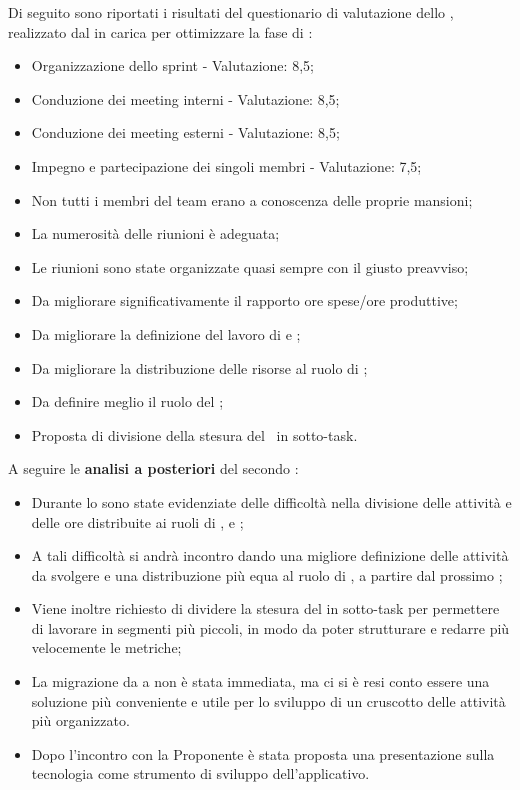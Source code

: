 \par Di seguito sono riportati i risultati del questionario di valutazione dello , realizzato dal \Responsabile{} in carica per ottimizzare la fase di :
\begin{itemize}
  \item Organizzazione dello sprint - Valutazione: 8,5;
  \item Conduzione dei meeting interni - Valutazione: 8,5;
  \item Conduzione dei meeting esterni - Valutazione: 8,5;
  \item Impegno e partecipazione dei singoli membri - Valutazione: 7,5;
  \item Non tutti i membri del team erano a conoscenza delle proprie mansioni;
  \item La numerosità delle riunioni è adeguata;
  \item Le riunioni sono state organizzate quasi sempre con il giusto preavviso;
  \item Da migliorare significativamente il rapporto ore spese/ore produttive;
  \item Da migliorare la definizione del lavoro di \Progettista{} e \Programmatore{};
  \item Da migliorare la distribuzione delle risorse al ruolo di \Amministratore{};
  \item Da definire meglio il ruolo del \Progettista{};
  \item Proposta di divisione della stesura del \PdQ\ in sotto-task.
\end{itemize}

\vspace{0.5\baselineskip}
\par A seguire le \textbf{analisi a posteriori} del secondo :
\begin{itemize}
  \item Durante lo  sono state evidenziate delle difficoltà nella divisione delle attività e delle ore distribuite ai ruoli di \Progettista{}, \Analista{} e \Programmatore{};
  \item A tali difficoltà si andrà incontro dando una migliore definizione delle attività da svolgere e una distribuzione più equa al ruolo di \Amministratore{}, a partire dal prossimo ;
  \item Viene inoltre richiesto di dividere la stesura del \PdQ in sotto-task per permettere di lavorare in segmenti più piccoli, in modo da poter strutturare e redarre più velocemente le metriche;
  \item La migrazione da  a  non è stata immediata, ma ci si è resi conto essere una soluzione più conveniente e utile per lo sviluppo di un cruscotto delle attività più organizzato.
  \item Dopo l'incontro con la Proponente è stata proposta una presentazione sulla tecnologia  come strumento di sviluppo dell'applicativo.
\end{itemize}

